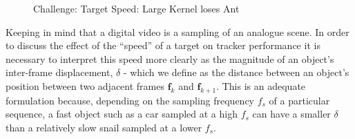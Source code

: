 \begin{figure}
    \caption{Challenge: Target Speed: Large Kernel loses Ant\label{fig_mean_shift_ant_speed2}}
\end{figure}

Keeping in mind that a digital video is a sampling of an analogue scene.
In order to discuss the effect of the ``speed'' of a target on tracker
performance it is necessary to interpret this speed more clearly
as the magnitude of an object's inter-frame displacement, $\delta$ - which
we define as the distance between an object's
position between two adjacent frames $\mathbf{f}_k$ and $\mathbf{f}_{k+1}$.
This is an adequate formulation because, depending on the sampling frequency $f_s$ of
a particular sequence, a fast object such as a car sampled at a high $f_s$ can
have a smaller $\delta$ than a relatively slow snail sampled at a lower $f_s$. 

